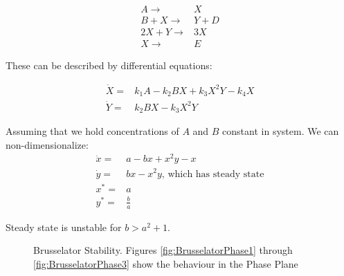 \documentclass[]{article}
\begin{document}
{\begin{align*}
	A \rightarrow& X\\
	B + X \rightarrow& Y + D\\
	2X + Y \rightarrow& 3X \\
	X \rightarrow& E
\end{align*}

These can be described by differential equations:

\begin{align*}
\dot X =& k_1 A - k_2 B X + k_3 X^2 Y -k_4 X\\
\dot Y =& k_2 B X -k_3 X^2 Y  
\end{align*}

Assuming that we hold concentrations of $A$ and $B$ constant in system. We can non-dimensionalize:
\begin{align*}
\dot x =& a - b x +x^2 y -x\\
\dot y =& bx - x^2 y\text{, which has steady state}\\
x^* =& a\\
y^* =& \frac{b}{a}
\end{align*}

Steady state is unstable for $b>a^2+1$. 

\begin{figure}[H]
	\caption[Brusselator Stability and Phase Plane]{Brusselator Stability. Figures \ref{fig:BrusselatorPhase1} through \ref{fig:BrusselatorPhase3} show the behaviour in the Phase Plane}\label{fig:BrusselatorStability}
	

\end{figure}}
\end{document}

